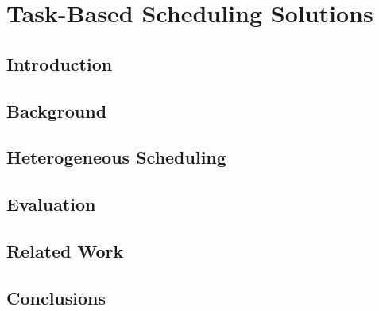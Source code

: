 \chapter{Task-Based Scheduling Solutions}
\section{Introduction}
\label{sec:intro}



\section{Background}
\label{sec:background}\label{sec:suitability}


\section{Heterogeneous Scheduling}
\label{sec:scheduling}


%

\section{Evaluation}
\label{sec:evaluation}


\section{Related Work}
\label{sec:related}


\section{Conclusions}
\label{sec:conclusions}


